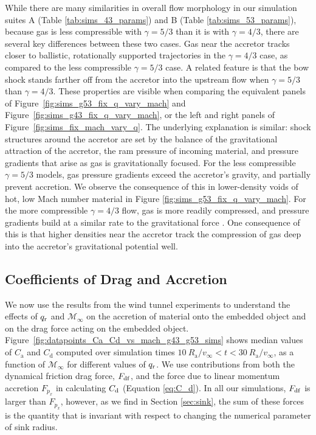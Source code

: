 While there are many similarities in overall flow morphology in our simulation suites A (Table \ref{tab:sims_43_params}) and B (Table \ref{tab:sims_53_params}), because gas is less compressible with $\gamma=5/3$ than it is with $\gamma=4/3$, there are several key differences between these two cases.   Gas near the accretor tracks closer to ballistic, rotationally supported trajectories in the $\gamma = 4/3$ case, as compared to the less compressible $\gamma = 5/3$ case. A related feature is that the bow shock stands farther off from the accretor into the upstream flow when  $\gamma = 5/3$  than $\gamma=4/3$. These properties are visible when comparing the equivalent panels of Figure~\ref{fig:sims_g53_fix_q_vary_mach} and Figure~\ref{fig:sims_g43_fix_q_vary_mach}, or the left and right panels of Figure~\ref{fig:sims_fix_mach_vary_q}.  The underlying explanation is similar: shock structures around the accretor are set by the balance of the gravitational attraction of the accretor, the ram pressure of incoming material, and pressure gradients that arise as gas is gravitationally focused.  For the less compressible $\gamma=5/3$ models, gas pressure gradients exceed the accretor's gravity, and partially prevent accretion. We observe the consequence of this in lower-density voids of hot, low Mach number material in Figure \ref{fig:sims_g53_fix_q_vary_mach}. For the more compressible $\gamma = 4/3$ flow, gas is more readily compressed, and pressure gradients build at a similar rate to the gravitational force \cite{Murguia-Berthier:2017}. One consequence of this is that higher densities near the accretor track the compression of gas deep into the accretor's gravitational potential well.

\vspace{2.5mm}
\subsection{Coefficients of Drag and Accretion}\label{sec:coeff}

We now use the results from the wind tunnel experiments to understand the effects of $q_{\rm r}$ and $\mathcal{M}_\infty$ on the accretion of material onto the embedded object and on the drag force acting on the embedded object. 
Figure~\ref{fig:datapoints_Ca_Cd_vs_mach_g43_g53_sims} shows median values of $C_{\mathrm a}$ and $C_{\mathrm d}$ computed over simulation times $10~R_{\mathrm{a}}/v_\infty < t < 30~R_{\mathrm{a}}/v_\infty$, as a function of $\mathcal{M}_\infty$ for different values of $q_{\rm r}$. We use contributions from both the dynamical friction drag force, $F_{\rm{df}}$, and the force due to linear momentum accretion $F_{\dot p_x}$ in calculating $C_{\rm d}$ (Equation \ref{eq:C_d}). In all our simulations, $F_{\rm{df}}$ is larger than $F_{\dot p_x}$, however, as we find in Section \ref{sec:sink}, the sum of these forces is the quantity that is invariant with respect to changing the numerical parameter of sink radius.

